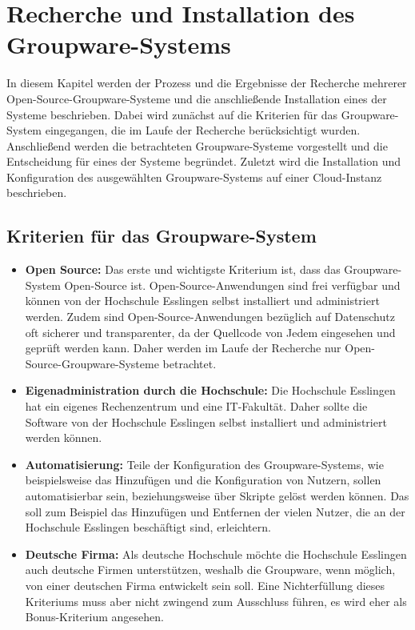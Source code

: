 
\chapter{Recherche und Installation des Groupware-Systems}

In diesem Kapitel werden der Prozess und die Ergebnisse der Recherche mehrerer Open-Source-Groupware-Systeme und die anschließende Installation eines der Systeme beschrieben.
Dabei wird zunächst auf die Kriterien für das Groupware-System eingegangen, die im Laufe der Recherche berücksichtigt wurden.
Anschließend werden die betrachteten Groupware-Systeme vorgestellt und die Entscheidung für eines der Systeme begründet.
Zuletzt wird die Installation und Konfiguration des ausgewählten Groupware-Systems auf einer Cloud-Instanz beschrieben.

\section{Kriterien für das Groupware-System}
\begin{itemize}
    \item \textbf{Open Source:} 
    Das erste und wichtigste Kriterium ist, dass das Groupware-System Open-Source ist.
    Open-Source-Anwendungen sind frei verfügbar und können von der Hochschule Esslingen selbst installiert und administriert werden.
    Zudem sind Open-Source-Anwendungen bezüglich auf Datenschutz oft sicherer und transparenter, da der Quellcode von Jedem eingesehen und geprüft werden kann.
    Daher werden im Laufe der Recherche nur Open-Source-Groupware-Systeme betrachtet.
    \item \textbf{Eigenadministration durch die Hochschule:}
    Die Hochschule Esslingen hat ein eigenes Rechenzentrum und eine IT-Fakultät.
    Daher sollte die Software von der Hochschule Esslingen selbst installiert und administriert werden können.
    \item \textbf{Automatisierung:}
    Teile der Konfiguration des Groupware-Systems, wie beispielsweise das Hinzufügen und die Konfiguration von Nutzern, sollen automatisierbar sein, beziehungsweise über Skripte gelöst werden können.
    Das soll zum Beispiel das Hinzufügen und Entfernen der vielen Nutzer, die an der Hochschule Esslingen beschäftigt sind, erleichtern.
    \item \textbf{Deutsche Firma:}
    Als deutsche Hochschule möchte die Hochschule Esslingen auch deutsche Firmen unterstützen, weshalb die Groupware, wenn möglich, von einer deutschen Firma entwickelt sein soll.
    Eine Nichterfüllung dieses Kriteriums muss aber nicht zwingend zum Ausschluss führen, es wird eher als Bonus-Kriterium angesehen.
\end{itemize}

